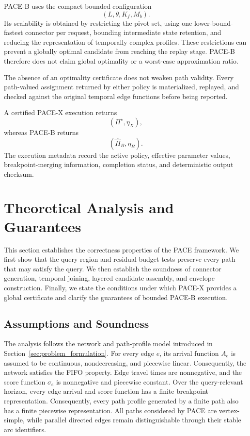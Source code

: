 \documentclass[a4paper,fleqn]{cas-dc}
\begin{document}
PACE-B uses the compact bounded configuration
\[
(L,\theta,K_f,M_b).
\]
Its scalability is obtained by restricting the pivot set, using one lower-bound-fastest connector per request, bounding intermediate state retention, and
reducing the representation of temporally complex profiles. These restrictions
can prevent a globally optimal candidate from reaching the replay stage.
PACE-B therefore does not claim global optimality or a worst-case
approximation ratio.

The absence of an optimality certificate does not weaken path validity. Every
path-valued assignment returned by either policy is materialized, replayed,
and checked against the original temporal edge functions before being
reported.

A certified PACE-X execution returns
\[
(\Pi^\star,\eta_X),
\]
whereas PACE-B returns
\[
(\widehat\Pi_B,\eta_B).
\]
The execution metadata record the active policy, effective parameter values,
breakpoint-merging information, completion status, and deterministic output
checksum.

\section{Theoretical Analysis and Guarantees}
\label{sec:analysis}

This section establishes the correctness properties of the PACE framework.
We first show that the query-region and residual-budget tests preserve every
path that may satisfy the query. We then establish the soundness of connector
generation, temporal joining, layered candidate assembly, and envelope
construction. Finally, we state the conditions under which PACE-X provides a
global certificate and clarify the guarantees of bounded PACE-B execution.

\subsection{Assumptions and Soundness}
\label{subsec:analysis_preliminaries}

The analysis follows the network and path-profile model introduced in
Section~\ref{sec:problem_formulation}. For every edge \(e\), its arrival
function \(A_e\) is assumed to be continuous, nondecreasing, and piecewise
linear. Consequently, the network satisfies the FIFO property. Edge travel
times are nonnegative, and the score function \(\sigma_e\) is nonnegative and
piecewise constant. Over the query-relevant horizon, every edge arrival and
score function has a finite breakpoint representation. Consequently, every
path profile generated by a finite path also has a finite piecewise
representation. All paths considered by PACE are vertex-simple, while parallel
directed edges remain distinguishable through their stable arc identifiers.
\end{document}
